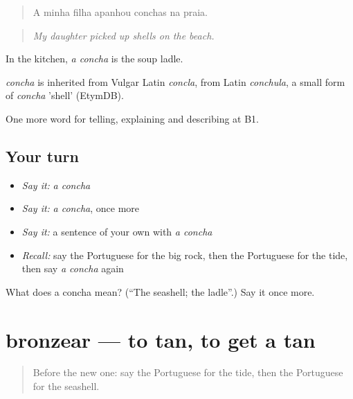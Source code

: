 \begin{quote}
A minha filha apanhou conchas na praia.
\end{quote}

\begin{quote}
\emph{My daughter picked up shells on the beach.}
\end{quote}

In the kitchen, \emph{a concha} is the soup ladle.

\begin{cousinweb}
\emph{concha} is inherited from Vulgar Latin \emph{concla}, from Latin \emph{conchula}, a small form of \emph{concha} 'shell' (EtymDB).
\end{cousinweb}

\begin{grammarlens}[title={What you've built}]
One more word for telling, explaining and describing at B1.
\end{grammarlens}

\subsection*{Your turn}
\begin{itemize}
\raggedright
  \item \emph{Say it:} \emph{a concha}
  \item \emph{Say it:} \emph{a concha}, once more
  \item \emph{Say it:} a sentence of your own with \emph{a concha}
  \item \emph{Recall:} say the Portuguese for the big rock, then the Portuguese for the tide, then say \emph{a concha} again
\end{itemize}

\begin{tcolorbox}[breakable,colback=teal!4,colframe=teal!35!black,title={Before you move on}]
What does a concha mean? (\textquotedblleft{}The seashell; the ladle\textquotedblright{}.) Say it once more.
\end{tcolorbox}
\section[bronzear]{bronzear — to tan, to get a tan}

\label{lesson:PT-C459-bronzear}



\begin{quote}
Before the new one: say the Portuguese for the tide, then the Portuguese for the seashell.
\end{quote}

